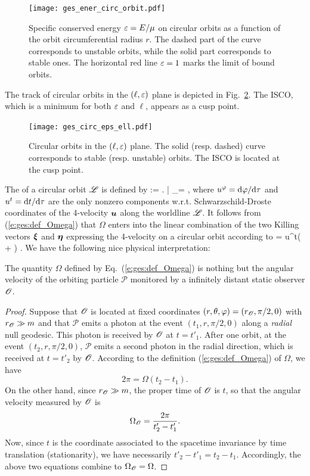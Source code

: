 \begin{figure}
\centerline{\texttt{[image: ges\_ener\_circ\_orbit.pdf]}}
\caption[]{\label{f:ges:ener_circ_orbit} \footnotesize
Specific conserved energy $\varepsilon = E/\mu$
on circular orbits as a function of the
orbit circumferential radius $r$.
The dashed part of the curve
corresponds to unstable orbits,
while the solid part corresponds to stable ones.
The horizontal red line $\varepsilon=1$ marks the limit of bound orbits.}
\end{figure}

The track of circular orbits in the $(\ell,\varepsilon)$ plane is depicted in
Fig.~\ref{f:ges:circ_eps_ell}. The ISCO, which is a minimum for both $\varepsilon$
and $\ell$, appears as a cusp point.

\begin{figure}
\centerline{\texttt{[image: ges\_circ\_eps\_ell.pdf]}}
\caption[]{\label{f:ges:circ_eps_ell} \footnotesize
Circular orbits in the $(\ell,\varepsilon)$ plane.
The solid (resp. dashed) curve
corresponds to stable (resp. unstable) orbits. The ISCO is located at the cusp point.}
\end{figure}

The  of a circular orbit $\mathscr{L}$ is defined by
\be \label{e:ges:def_Omega}
    \Omega := \left.  \right| _\Li =  ,
\ee
where $u^\varphi = \mathrm{d}\varphi/\mathrm{d}\tau$ and $u^t = \mathrm{d} t/\mathrm{d}\tau$ are the only
nonzero components w.r.t. Schwarzschild-Droste coordinates
of the 4-velocity $\bm{u}$ along the worldline
$\mathscr{L}$. It follows from (\ref{e:ges:def_Omega}) that
$\Omega$ enters into the linear combination of the two Killing
vectors $\bm{\xi}$ and $\bm{\eta}$ expressing the 4-velocity on a circular
orbit according to
\be
     = u^t\left( \w{\xi} + \Omega \w{\eta} \right) .
\ee
We have the following nice physical interpretation:
\begin{greybox}
The quantity $\Omega$ defined by Eq.~(\ref{e:ges:def_Omega}) is nothing but
the angular velocity of the orbiting particle $\mathscr{P}$ monitored by a infinitely
distant static observer $\mathscr{O}$.
\end{greybox}
\begin{proof}
Suppose that $\mathscr{O}$ is located at fixed coordinates
$(r,\theta,\varphi)=(r_{\mathscr{O}},\pi/2,0)$ with $r_{\mathscr{O}}\gg m$ and that
$\mathscr{P}$ emits a photon at the event
$(t_1, r, \pi/2, 0)$ along a \emph{radial} null geodesic. This photon is received
by $\mathscr{O}$ at $t=t'_1$. After one orbit, at the event $(t_2, r, \pi/2, 0)$,
$\mathscr{P}$ emits a second photon in the radial direction, which is received
at $t=t'_2$ by $\mathscr{O}$. According to the definition (\ref{e:ges:def_Omega})
of $\Omega$, we have
\[
    2\pi = \Omega(t_2 - t_1) .
\]
On the other hand, since $r_{\mathscr{O}}\gg m$, the proper time of $\mathscr{O}$ is $t$, so that the
angular velocity measured by $\mathscr{O}$ is
\[
    \Omega_{\mathscr{O}} = \frac{2\pi}{t'_2 - t'_1} .
\]
Now, since $t$ is the coordinate associated to
the spacetime invariance by time translation (stationarity), we have
necessarily $t'_2 - t'_1 = t_2 - t_1$. Accordingly, the above two equations
combine to $\Omega_{\mathscr{O}} = \Omega$.
\end{proof}

